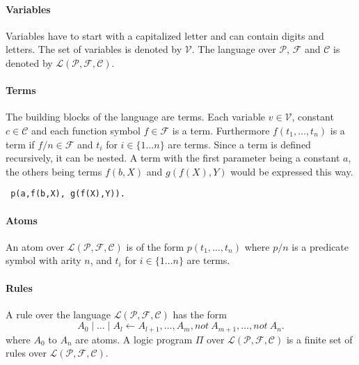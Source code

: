 \documentclass[a4paper,10pt]{article}
\begin{document}
\paragraph{Variables}
Variables have to start with a capitalized letter and can contain digits and letters.
The set of variables is denoted by $\mathcal{V}$.
The language over $\mathcal{P}$, $\mathcal{F}$ and $\mathcal{C}$ is denoted by $\mathcal{L(P,F,C)}$.
\paragraph{Terms}
The building blocks of the language are terms.
Each variable $v \in \mathcal{V}$, constant $c \in \mathcal{C}$ and each function symbol $f \in \mathcal{F}$ is a term.
Furthermore $f(t_1, \dots, t_n)$ is a term if $f/n \in \mathcal{F}$ and $t_i$ for $i \in \{1 \dots n\}$ are terms.
Since a term is defined recursively, it can be nested.
A term with the first parameter being a constant $a$, the others being terms $f(b,X)$ and $g(f(X), Y)$ would be expressed this way.
\begin{verbatim}
 p(a,f(b,X), g(f(X),Y)).
\end{verbatim}
\paragraph{Atoms}
An atom over $\mathcal{L(P, F, C)}$ is of the form $p(t_1, \dots, t_n)$ where $p/n$ is a predicate
symbol with arity $n$, and $t_i$ for $i \in \{1 \dots n\}$ are terms.
\paragraph{Rules}
A rule over the language $\mathcal{L(P,F,C)}$ has the form
$$
A_0 \mid \dots \mid A_l \leftarrow A_{l+1}, \dots, A_m, not\ A_{m+1}, \dots, not\ A_n.
$$
where $A_0$ to $A_n$ are atoms. \newline
A logic program $\Pi$ over $\mathcal{L(P,F,C)}$ is a finite set of rules over $\mathcal{L(P,F,C)}$.
\end{document}
